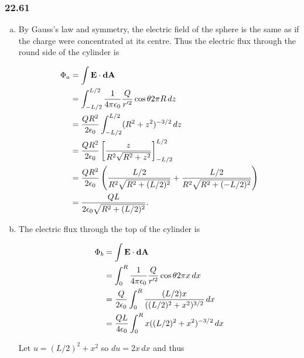 \documentclass{article}
\begin{document}
\subsubsection{22.61}

\begin{enumerate}[a)]
  \item By Gauss's law and symmetry, the electric field of the sphere is the same as if the charge were concentrated at its centre. Thus the electric flux through the round side of the cylinder is

        \begin{align*}
          \Phi_a & = \int \mathbf{E} \cdot \mathbf{dA}                                                                                              \\
                 & = \int_{-L / 2}^{L / 2} \frac{1}{4 \pi \epsilon_0} \frac{Q}{r'^2} \cos \theta 2 \pi R \, dz                                                             \\
                 & = \frac{Q R^2}{2 \epsilon_0} \int_{-L / 2}^{L / 2} (R^2 + z^2)^{-3/2} \, dz                                                      \\
                 & = \frac{Q R^2}{2 \epsilon_0} \left[ \frac{z}{R^2 \sqrt{R^2 + z^2}} \right]_{-L / 2}^{L / 2}                                      \\
                 & = \frac{Q R^2}{2 \epsilon_0} \left( \frac{L / 2}{R^2 \sqrt{R^2 + (L / 2)^2}} + \frac{L / 2}{R^2 \sqrt{R^2 + (-L / 2)^2}} \right) \\
                 & = \frac{Q L}{2 \epsilon_0 \sqrt{R^2 + (L / 2)^2}}.
        \end{align*}

  \item The electric flux through the top of the cylinder is

        \begin{align*}
          \Phi_b & = \int \mathbf{E} \cdot \mathbf{dA}                                               \\
                 & = \int_0^R \frac{1}{4 \pi \epsilon_0} \frac{Q}{r'^2} \cos \theta 2 \pi x \, dx                           \\
                 & = \frac{Q}{2 \epsilon_0} \int_0^R \frac{(L / 2) x}{((L / 2)^2 + x^2)^{3/2}} \, dx \\
                 & = \frac{Q L}{4 \epsilon_0} \int_0^R x ((L / 2)^2 + x^2)^{-3/2} \, dx
        \end{align*}

        Let $u = (L / 2)^2 + x^2$ so $du = 2 x \, dx$ and thus


\end{enumerate}
\end{document}
